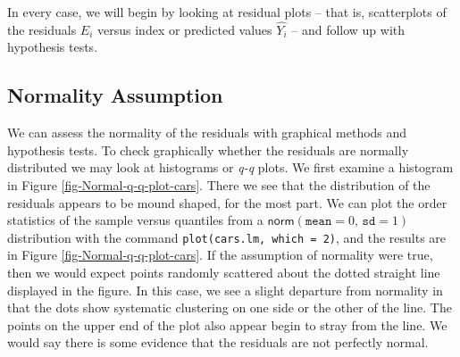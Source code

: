 \documentclass[captions=tableheading]{scrbook}
\begin{document}
In every case, we will begin by looking at residual plots -- that is, scatterplots of the residuals \(E_{i}\) versus index or predicted values \(\hat{Y_{i}}\) -- and follow up with hypothesis tests.
\subsection{Normality Assumption}
\label{sec-11-4-1}
\label{sub-Normality-Assumption}


We can assess the normality of the residuals with graphical methods and hypothesis tests. To check graphically whether the residuals are normally distributed we may look at histograms or \emph{q-q} plots. We first examine a histogram in Figure \ref{fig-Normal-q-q-plot-cars}. There we see that the distribution of the residuals appears to be mound shaped, for the most part. We can plot the order statistics of the sample versus quantiles from a \(\mathsf{norm}(\mathtt{mean}=0,\,\mathtt{sd}=1)\) distribution with the command \texttt{plot(cars.lm, which = 2)}, and the results are in Figure \ref{fig-Normal-q-q-plot-cars}. If the assumption of normality were true, then we would expect points randomly scattered about the dotted straight line displayed in the figure. In this case, we see a slight departure from normality in that the dots show systematic clustering on one side or the other of the line. The points on the upper end of the plot also appear begin to stray from the line. We would say there is some evidence that the residuals are not perfectly normal. 
\end{document}
